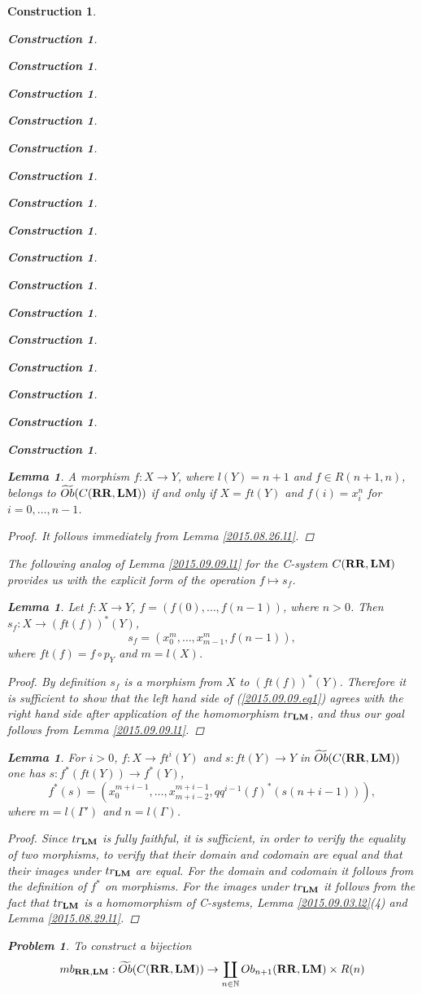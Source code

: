 \documentclass[12pt]{amsart}
\newtheorem{lemma}[proposition]{Lemma}
\numberwithin{proposition}{subsection}
\newtheorem{problem}[proposition]{Problem}
\newtheorem{construction}[proposition]{Construction}
\newcommand{\llabel}[1]{\label{#1}}
\newcommand{\sr}{\rightarrow}
\newcommand{\nn}{{\mathbb N}}
\newcommand{\nat}{\nn}
\newcommand{\wt}{\widetilde}
\newcommand{\mbind}[1]{{#1^*}}
\newcommand{\RR}{{\bf RR}}
\newcommand{\LM}{{\bf LM}}
\begin{document}
\begin{construction}
\begin{construction}
\begin{construction}
\begin{construction}
\begin{construction}
\begin{construction}
\begin{construction}
\begin{construction}
\begin{construction}
\begin{construction}
\begin{construction}
\begin{construction}
\begin{construction}
\begin{construction}
\begin{construction}
\begin{construction}
\begin{construction}
%
\begin{lemma}
\llabel{2015.08.22.l5} A morphism $f:X\sr Y$, where $l(Y)=n+1$ and $f\in
R(n+1,n)$, belongs to $\wt{Ob}(C(\RR,\LM))$ if and only if $X=ft(Y)$ and
$f(i)=x^n_i$ for $i=0,\dots,n-1$.
\end{lemma}
%
\begin{proof}
It follows immediately from Lemma \ref{2015.08.26.l1}.
\end{proof}
%
The following analog of Lemma \ref{2015.09.09.l1} for the C-system $C(\RR,\LM)$
provides us with the explicit form of the operation $f\mapsto s_f$.
%
\begin{lemma}
\llabel{2015.09.09.l2}
Let $f:X\sr Y$, $f=(f(0),\dots,f(n-1))$, where $n>0$. Then $s_f:X\sr (ft(f))^*(Y)$,
%
\begin{equation}\llabel{2015.09.09.eq1}
s_f=(x_0^{m},\dots,x_{m-1}^{m},f(n-1)),
\end{equation}%
%
where $ft(f)=f\circ p_Y$ and $m=l(X)$. 
\end{lemma}
%
\begin{proof}
By definition $s_f$ is a morphism from $X$ to $(ft(f))^*(Y)$. Therefore it is
sufficient to show that the left hand side of (\ref{2015.09.09.eq1}) agrees
with the right hand side after application of the homomorphism $tr_{\LM}$, and thus
our goal follows from Lemma \ref{2015.09.09.l1}.
\end{proof}
%
\begin{lemma}
\llabel{2015.09.03.l1}
For $i>0$, $f:X\sr ft^i(Y)$ and $s:ft(Y)\sr Y$ in $\wt{Ob}(C(\RR,\LM))$ one has $s:f^*(ft(Y))\sr f^*(Y)$,
%
$$f^*(s)=(x_0^{m+i-1},\dots,x_{m+i-2}^{m+i-1},\mbind{qq^{i-1}(f)}(s(n+i-1))),$$
%
where $m=l(\Gamma')$ and $n=l(\Gamma)$.
\end{lemma}
%
\begin{proof}
Since $tr_{\LM}$ is fully faithful, it is sufficient, in order to verify the
equality of two morphisms, to verify that their domain and codomain are equal
and that their images under $tr_{\LM}$ are equal. For the domain and codomain
it follows from the definition of $f^*$ on morphisms. For the images under
$tr_{\LM}$ it follows from the fact that $tr_{\LM}$ is a homomorphism of
C-systems, Lemma \ref{2015.09.03.l2}(4) and Lemma \ref{2015.08.29.l1}.
\end{proof}
%
\begin{problem}
\llabel{2015.08.22.prob1}
To construct a bijection
%
\begin{equation}
\llabel{2009.10.15.eq2}
mb_{\RR,\LM}:\wt{Ob}(C(\RR,\LM))\sr \coprod_{n\in\nat} Ob_{n+1}(\RR,\LM)\times R(n)

\end{equation}
\end{problem}
\end{construction}
\end{construction}
\end{construction}
\end{construction}
\end{construction}
\end{construction}
\end{construction}
\end{construction}
\end{construction}
\end{construction}
\end{construction}
\end{construction}
\end{construction}
\end{construction}
\end{construction}
\end{construction}
\end{construction}
\end{document}

